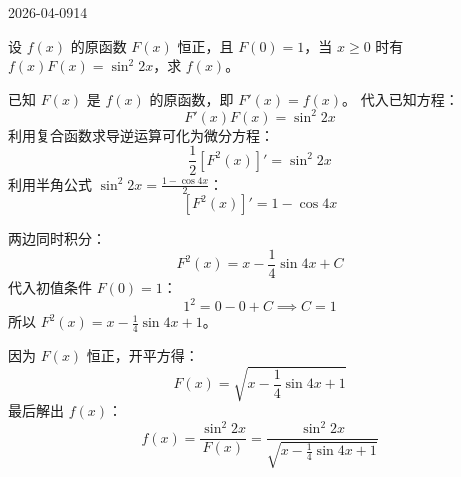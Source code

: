 \begin{mistake}{2026-04-09}{14}

\begin{problemcontent}
设 \( f(x) \) 的原函数 \( F(x) \) 恒正，且 \( F(0)=1 \)，当 \( x \geqslant 0 \) 时有 \( f(x)F(x) = \sin^2 2x \)，求 \( f(x) \)。
\end{problemcontent}

\begin{solutioncontent}
已知 \(F(x)\) 是 \(f(x)\) 的原函数，即 \( F'(x) = f(x) \)。
代入已知方程：
\[ F'(x)F(x) = \sin^2 2x \]
利用复合函数求导逆运算可化为微分方程：
\[ \frac{1}{2} [F^2(x)]' = \sin^2 2x \]
利用半角公式 \(\sin^2 2x = \frac{1 - \cos 4x}{2}\)：
\[ [F^2(x)]' = 1 - \cos 4x \]

两边同时积分：
\[ F^2(x) = x - \frac{1}{4}\sin 4x + C \]
代入初值条件 \(F(0)=1\)：
\[ 1^2 = 0 - 0 + C \implies C = 1 \]
所以 \(F^2(x) = x - \frac{1}{4}\sin 4x + 1\)。

因为 \(F(x)\) 恒正，开平方得：
\[ F(x) = \sqrt{x - \frac{1}{4}\sin 4x + 1} \]
最后解出 \(f(x)\)：
\[ f(x) = \frac{\sin^2 2x}{F(x)} = \frac{\sin^2 2x}{\sqrt{x - \frac{1}{4}\sin 4x + 1}} \]
\end{solutioncontent}


\end{mistake}
